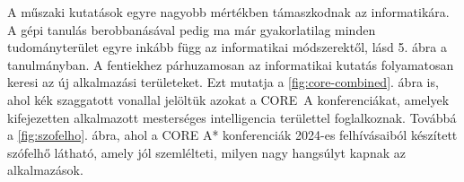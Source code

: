 \documentclass[12pt,a4paper]{article}
\begin{document}



A műszaki kutatások egyre nagyobb mértékben támaszkodnak az informatikára. A gépi tanulás berobbanásával pedig ma már gyakorlatilag minden tudományterület egyre inkább függ az informatikai módszerektől, lásd 5. ábra a \cite{hajkowicz2023artificial} tanulmányban.
A fentiekhez párhuzamosan az informatikai kutatás folyamatosan keresi az új alkalmazási területeket. Ezt mutatja a \ref{fig:core-combined}. ábra is, ahol kék szaggatott vonallal jelöltük azokat a CORE~A konferenciákat, amelyek kifejezetten alkalmazott mesterséges intelligencia területtel foglalkoznak. Továbbá a \ref{fig:szofelho}. ábra, ahol a CORE A\!* konferenciák 2024-es felhívásaiból készített szófelhő látható, amely jól szemlélteti, milyen nagy hangsúlyt kapnak az alkalmazások.

\end{document}
